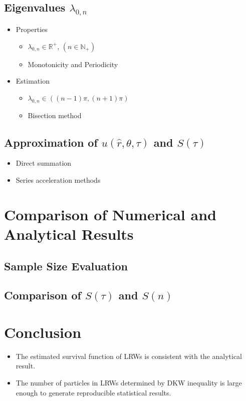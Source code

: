    \subsection{Eigenvalues $\lambda_{0, n}$}
     \begin{itemize}
       \item Properties
         \begin{itemize}
            \item $\lambda_{0, n} \in \mathbb{R}^{+}$, $(n \in \mathbb{N}_{+})$
            \item Monotonicity and Periodicity
         \end{itemize}
         
       \item Estimation
         \begin{itemize}
          \item $\lambda_{0, n} \in ((n-1) \pi, (n+1) \pi)$ \cite{NIST:DLMF}
          \item Bisection method \cite{2020SciPy-NMeth}
         \end{itemize}
   
     \end{itemize}

 
   \subsection{Approximation of $u(\hat r, \theta, \tau)$ and $S(\tau)$}
     \begin{itemize}
       \item Direct summation
       \item Series acceleration methods
     \end{itemize}
     

 \section{Comparison of Numerical and Analytical Results}

   \subsection{Sample Size Evaluation}

   \subsection{Comparison of $S(\tau)$ and $S(n)$}


   
\section{Conclusion}

  \begin{itemize}
    \item The estimated survival function of LRWs is consistent with the analytical result.
    \item The number of particles in LRWs determined by DKW inequality is large enough to generate reproducible statistical results. 
  \end{itemize}

